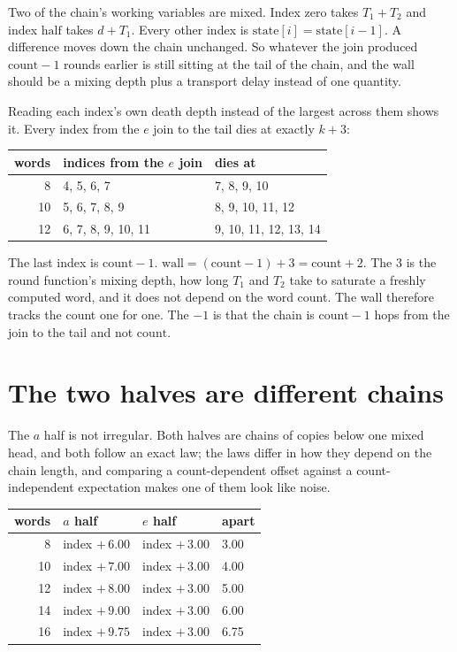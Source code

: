 Two of the chain's working variables are mixed. Index zero takes \(T_1 + T_2\) and index \(\mathrm{half}\) takes \(d + T_1\). Every other index is \(\mathrm{state}[i] = \mathrm{state}[i-1]\). A difference moves down the chain unchanged. So whatever the join produced \(\mathrm{count} - 1\) rounds earlier is still sitting at the tail of the chain, and the wall should be a mixing depth plus a transport delay instead of one quantity.

Reading each index's own death depth instead of the largest across them shows it. Every index from the \(e\) join to the tail dies at exactly \(k + 3\):

\begin{center}
\begin{tabular}{rll}
\toprule
words & indices from the \(e\) join & dies at \\
\midrule
8 & 4, 5, 6, 7 & 7, 8, 9, 10 \\
10 & 5, 6, 7, 8, 9 & 8, 9, 10, 11, 12 \\
12 & 6, 7, 8, 9, 10, 11 & 9, 10, 11, 12, 13, 14 \\
\bottomrule
\end{tabular}
\end{center}

The last index is \(\mathrm{count} - 1\). \(\mathrm{wall} = (\mathrm{count} - 1) + 3 = \mathrm{count} + 2\). The \(3\) is the round function's mixing depth, how long \(T_1\) and \(T_2\) take to saturate a freshly computed word, and it does not depend on the word count. The wall therefore tracks the count one for one. The \(-1\) is that the chain is \(\mathrm{count} - 1\) hops from the join to the tail and not \(\mathrm{count}\).

\section{The two halves are different chains}

The \(a\) half is not irregular. Both halves are chains of copies below one mixed head, and both follow an exact law; the laws differ in how they depend on the chain length, and comparing a count-dependent offset against a count-independent expectation makes one of them look like noise.

\begin{center}
\begin{tabular}{rlll}
\toprule
words & \(a\) half & \(e\) half & apart \\
\midrule
8 & index \(+\, 6.00\) & index \(+\, 3.00\) & 3.00 \\
10 & index \(+\, 7.00\) & index \(+\, 3.00\) & 4.00 \\
12 & index \(+\, 8.00\) & index \(+\, 3.00\) & 5.00 \\
14 & index \(+\, 9.00\) & index \(+\, 3.00\) & 6.00 \\
16 & index \(+\, 9.75\) & index \(+\, 3.00\) & 6.75 \\
\bottomrule
\end{tabular}
\end{center}

